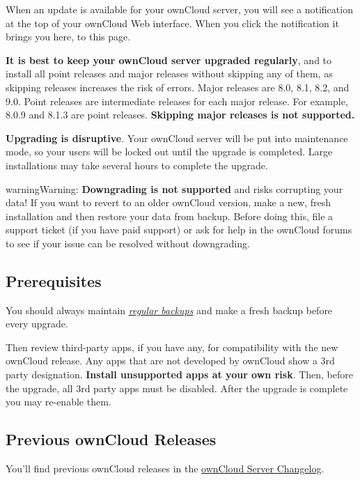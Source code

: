 \documentclass[letterpaper,10pt,english]{sphinxmanual}
\begin{document}
When an update is available for your ownCloud server, you will see a
notification at the top of your ownCloud Web interface. When you click the
notification it brings you here, to this page.

\textbf{It is best to keep your ownCloud server upgraded regularly}, and to install
all point releases and major releases without skipping any of them, as skipping
releases increases the risk of errors. Major releases are 8.0, 8.1, 8.2, and
9.0. Point releases are intermediate releases for each major release. For
example, 8.0.9 and 8.1.3 are point releases. \textbf{Skipping major releases is not
supported.}

\textbf{Upgrading is disruptive}. Your ownCloud server will be put into maintenance
mode, so your users will be locked out until the upgrade is completed. Large
installations may take several hours to complete the upgrade.

\begin{notice}{warning}{Warning:}
\textbf{Downgrading is not supported} and risks corrupting your data! If
you want to revert to an older ownCloud version, make a new, fresh
installation and then restore your data from backup. Before doing this,
file a support ticket (if you have paid support) or ask for help in the
ownCloud forums to see if your issue can be resolved without downgrading.
\end{notice}


\subsection{Prerequisites}
\label{maintenance/upgrade:prerequisites}
You should always maintain {\hyperref[maintenance/backup::doc]{\emph{\emph{regular backups}}}} and make a fresh
backup before every upgrade.

Then review third-party apps, if you have any, for compatibility with the new
ownCloud release. Any apps that are not developed by ownCloud show a 3rd party
designation. \textbf{Install unsupported apps at your own risk}. Then, before the
upgrade, all 3rd party apps must be disabled. After the upgrade is complete you
may re-enable them.


\subsection{Previous ownCloud Releases}
\label{maintenance/upgrade:previous-owncloud-releases}\label{maintenance/upgrade:owncloud-org-install}
You'll find previous ownCloud releases in the \href{https://owncloud.org/changelog/}{ownCloud Server Changelog}.
\end{document}
